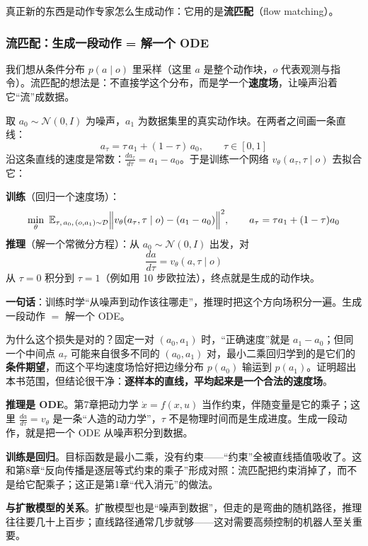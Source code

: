 真正新的东西是动作专家怎么生成动作：它用的是\textbf{流匹配}（flow matching）。

\subsubsection{流匹配：生成一段动作 = 解一个 ODE}

我们想从条件分布 $p(a \mid o)$ 里采样（这里 $a$ 是整个动作块，$o$ 代表观测与指令）。流匹配的想法是：不直接学这个分布，而是学一个\textbf{速度场}，让噪声沿着它“流”成数据。

取 $a_0 \sim \mathcal{N}(0, I)$ 为噪声，$a_1$ 为数据集里的真实动作块。在两者之间画一条直线：
\begin{equation}
    a_\tau = \tau\, a_1 + (1 - \tau)\, a_0, \qquad \tau \in [0, 1]
\end{equation}
沿这条直线的速度是常数：$\frac{d a_\tau}{d\tau} = a_1 - a_0$。于是训练一个网络 $v_\theta(a_\tau, \tau \mid o)$ 去拟合它：

\begin{keyformula}[title=流匹配：训练是回归，推理是积分]
\textbf{训练}（回归一个速度场）：
\begin{equation}
    \min_\theta\ \mathbb{E}_{\tau,\, a_0,\, (o, a_1)\sim\mathcal{D}} \Big\| v_\theta(a_\tau, \tau \mid o) - (a_1 - a_0) \Big\|^2, \qquad a_\tau = \tau a_1 + (1-\tau) a_0
\end{equation}
\textbf{推理}（解一个常微分方程）：从 $a_0 \sim \mathcal{N}(0, I)$ 出发，对
\begin{equation}
    \frac{d a}{d\tau} = v_\theta(a, \tau \mid o)
\end{equation}
从 $\tau = 0$ 积分到 $\tau = 1$（例如用 10 步欧拉法），终点就是生成的动作块。

\textbf{一句话}：训练时学“从噪声到动作该往哪走”，推理时把这个方向场积分一遍。生成一段动作 $=$ 解一个 ODE。
\end{keyformula}

为什么这个损失是对的？固定一对 $(a_0, a_1)$ 时，“正确速度”就是 $a_1 - a_0$；但同一个中间点 $a_\tau$ 可能来自很多不同的 $(a_0, a_1)$ 对，最小二乘回归学到的是它们的\textbf{条件期望}，而这个平均速度场恰好把边缘分布 $p(a_0)$ 输运到 $p(a_1)$。证明超出本书范围，但结论很干净：\textbf{逐样本的直线，平均起来是一个合法的速度场}。

\begin{insightbox}[title=流匹配与本书主线]
\textbf{推理是 ODE}。第7章把动力学 $\dot{x} = f(x, u)$ 当作约束，伴随变量是它的乘子；这里 $\frac{da}{d\tau} = v_\theta$ 是一条“人造的动力学”，$\tau$ 不是物理时间而是生成进度。生成一段动作，就是把一个 ODE 从噪声积分到数据。

\textbf{训练是回归}。目标函数是最小二乘，没有约束——“约束”全被直线插值吸收了。这和第8章“反向传播是逐层等式约束的乘子”形成对照：流匹配把约束消掉了，而不是给它配乘子；这正是第1章“代入消元”的做法。

\textbf{与扩散模型的关系}。扩散模型也是“噪声到数据”，但走的是弯曲的随机路径，推理往往要几十上百步；直线路径通常几步就够——这对需要高频控制的机器人至关重要。
\end{insightbox}

